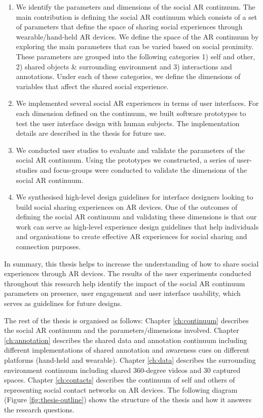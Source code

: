 \begin{enumerate}
    \item We identify the parameters and dimensions of the social AR continuum. The main contribution is defining the social AR continuum which consists of a set of parameters that define the space of sharing social experiences through wearable/hand-held AR devices. We define the space of the AR continuum by exploring the main parameters that can be varied based on social proximity. These parameters are grouped into the following categories 1) self and other, 2) shared objects \& surrounding environment and 3) interactions and annotations. Under each of these categories, we define the dimensions of variables that affect the shared social experience.
    
    \item We implemented several social AR experiences in terms of user interfaces. For each dimension defined on the continuum, we built software prototypes to test the user interface design with human subjects. The implementation details are described in the thesis for future use.
    
    \item We conducted user studies to evaluate and validate the parameters of the social AR continuum. Using the prototypes we constructed, a series of user-studies and focus-groups were conducted to validate the dimensions of the social AR continuum.
    
    \item We synthesised high-level design guidelines for interface designers looking to build social sharing experiences on AR devices. One of the outcomes of defining the social AR continuum and validating these dimensions is that our work can serve as high-level experience design guidelines that help individuals and organisations to create effective AR experiences for social sharing and connection purposes.
\end{enumerate}

In summary, this thesis helps to increase the understanding of how to share social experiences through AR devices. The results of the user experiments conducted throughout this research help identify the impact of the social AR continuum parameters on presence, user engagement and user interface usability, which serves as guidelines for future designs. 

The rest of the thesis is organised as follows: Chapter \ref{ch:continuum} describes the social AR continuum and the parameters/dimensions involved. Chapter \ref{ch:annotation} describes the shared data and annotation continuum including different implementations of shared annotation and awareness cues on different platforms (hand-held and wearable). Chapter \ref{ch:data} describes the surrounding environment continuum including shared 360-degree videos and 30 captured spaces. Chapter \ref{ch:contacts} describes the continuum of self and others of representing social contact networks on AR devices. The following diagram (Figure \ref{fig:thesis-outline}) shows the structure of the thesis and how it answers the research questions. 

